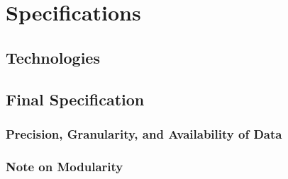 \section{Specifications}
	

	

	

\subsection{Technologies}
	
	
	



\subsection{Final Specification}
		

		

		


\subsubsection{Precision, Granularity, and Availability of Data}
		


\subsubsection{Note on Modularity}
		


